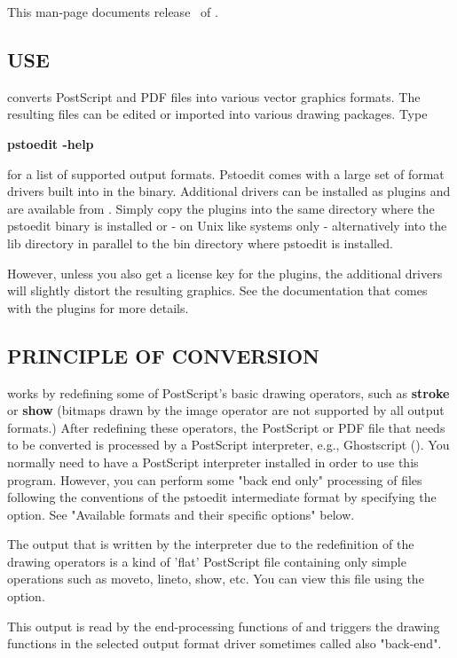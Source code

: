 \documentclass[english,a4paper]{article}
\begin{document}
This man-page documents release \Version\ of .

\subsection{USE}

 converts PostScript and PDF files into various vector graphics
formats. The resulting files can be edited or imported into various drawing
packages. Type

     \textbf{pstoedit -help}

\noindent for a list of supported output formats. Pstoedit comes with a
large set of format drivers built into in the binary. Additional drivers can be
installed as plugins and are available from
.
Simply copy the plugins into the same directory where the pstoedit binary is installed or - on Unix like systems only - alternatively into the lib directory in parallel to the bin directory where pstoedit is installed.

However, unless you also get a license key for the plugins, the additional
drivers will slightly distort the resulting graphics. See the documentation
that comes with the plugins for more details.

\subsection{PRINCIPLE OF CONVERSION}

 works by redefining some of PostScript's basic drawing operators,
such as \textbf{stroke} or \textbf{show} (bitmaps drawn by the image
operator are not supported by all output formats.) After
redefining these operators, the PostScript or PDF file that needs to be
converted is processed by a PostScript interpreter, e.g., Ghostscript
(). You normally need to have a PostScript interpreter installed in
order to use this program. However, you can perform some "back end only" processing
of files following the conventions of the pstoedit intermediate format by specifying the  option. See "Available formats and their specific options" below.

The output that is written by the interpreter due to the redefinition of the
drawing operators is a kind of 'flat' PostScript file containing only simple
operations such as moveto, lineto, show, etc. You can view this file using the
 option.

This output is read by the end-processing functions of  and triggers
the drawing functions in the selected output format driver sometimes called also "back-end".
\end{document}
